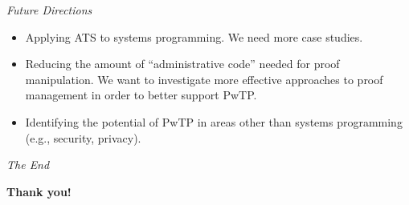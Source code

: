 \documentclass[pdf]{prosper}
\begin{document}
\begin{slide}{\em Future Directions}
\begin{itemize}
\item Applying ATS to systems programming. We need more case studies.
\item
Reducing the amount of ``administrative code'' needed for proof
manipulation. We want to investigate more effective approaches to proof
management in order to better support PwTP.
\item
Identifying the potential of PwTP in areas other than systems programming
(e.g., security, privacy).
\end{itemize}
\end{slide}
\begin{slide}{\em The End}
\vspace{72pt}
\begin{center}
{\huge\bf Thank you!}
\end{center}
\end{slide}
\end{document}
